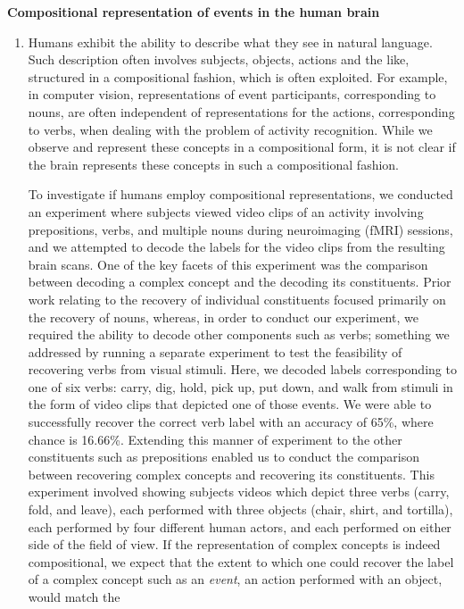 \documentclass[10pt]{article}
\newenvironment{researchBlock}[1]{%
  \vspace*{0.5ex}
  {\large \textbf{#1}}
  \begin{enumerate}\item[]}
  {\end{enumerate}}
\begin{document}
\begin{researchBlock} {Compositional representation of events in the human brain}
  Humans exhibit the ability to describe what they see in natural language.
  Such description often involves subjects, objects, actions and the like,
  structured in a compositional fashion, which is often exploited.
  For example, in computer vision, representations of event participants,
  corresponding to nouns, are often independent of representations for the
  actions, corresponding to verbs, when dealing with the problem of activity
  recognition.
  While we observe and represent these concepts in a compositional form, it is
  not clear if the brain represents these concepts in such a compositional
  fashion.

  To investigate if humans employ compositional representations, we conducted
  an experiment where subjects viewed video clips of an activity involving
  prepositions, verbs, and multiple nouns during neuroimaging (fMRI) sessions,
  and we attempted to decode the labels for the video clips from the resulting
  brain scans.
  One of the key facets of this experiment was the comparison between decoding
  a complex concept and the decoding its constituents.
  Prior work relating to the recovery of individual constituents focused
  primarily on the recovery of nouns, whereas, in order to conduct our
  experiment, we required the ability to decode other components such as verbs;
  something we addressed by running a separate experiment to test the
  feasibility of recovering verbs from visual stimuli.
  Here, we decoded labels corresponding to one of six verbs: carry, dig, hold,
  pick up, put down, and walk from stimuli in the form of video clips that
  depicted one of those events.
  We were able to successfully recover the correct verb label with an accuracy
  of 65\%, where chance is 16.66\%.
  Extending this manner of experiment to the other constituents such as
  prepositions enabled us to conduct the comparison between recovering complex
  concepts and recovering its constituents.
  This experiment involved showing subjects videos which depict three verbs
  (carry, fold, and leave), each performed with three objects (chair, shirt,
  and tortilla), each performed by four different human actors, and each
  performed on either side of the field of view.
  If the representation of complex concepts is indeed compositional, we expect
  that the extent to which one could recover the label of a complex concept
  such as an \emph{event}, an action performed with an object, would match the

\end{researchBlock}
\end{document}
